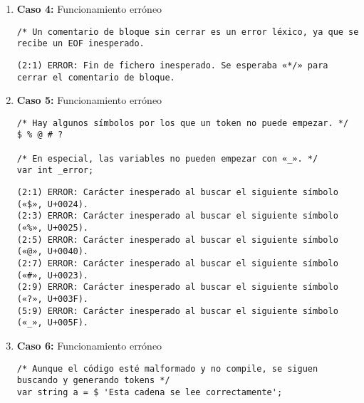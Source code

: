 \documentclass{article}
\begin{document}
\begin{enumerate}
    
    \item \textbf{Caso 4:} Funcionamiento erróneo
    \begin{tcolorbox}[title={Código fuente}, colback=white]
        \begin{lstlisting}
/* Un comentario de bloque sin cerrar es un error léxico, ya que se recibe un EOF inesperado.
        \end{lstlisting}      
    \end{tcolorbox}

    \begin{tcolorbox}[title={Errores detectados}, colback=white]
        \begin{lstlisting}
(2:1) ERROR: Fin de fichero inesperado. Se esperaba «*/» para cerrar el comentario de bloque.
        \end{lstlisting}
    \end{tcolorbox}


    \item \textbf{Caso 5:} Funcionamiento erróneo
    \begin{tcolorbox}[title={Código fuente}, colback=white]
        \begin{lstlisting}
/* Hay algunos símbolos por los que un token no puede empezar. */
$ % @ # ?

/* En especial, las variables no pueden empezar con «_». */
var int _error;
        \end{lstlisting}      
    \end{tcolorbox}

    \begin{tcolorbox}[title={Errores detectados}, colback=white]
        \begin{lstlisting}
(2:1) ERROR: Carácter inesperado al buscar el siguiente símbolo («$», U+0024).
(2:3) ERROR: Carácter inesperado al buscar el siguiente símbolo («%», U+0025).
(2:5) ERROR: Carácter inesperado al buscar el siguiente símbolo («@», U+0040).
(2:7) ERROR: Carácter inesperado al buscar el siguiente símbolo («#», U+0023).
(2:9) ERROR: Carácter inesperado al buscar el siguiente símbolo («?», U+003F).
(5:9) ERROR: Carácter inesperado al buscar el siguiente símbolo («_», U+005F).
        \end{lstlisting}
    \end{tcolorbox}

    
    \item \textbf{Caso 6:} Funcionamiento erróneo
    \begin{tcolorbox}[title={Código fuente}, colback=white]
        \begin{lstlisting}
/* Aunque el código esté malformado y no compile, se siguen buscando y generando tokens */
var string a = $ 'Esta cadena se lee correctamente';


\end{lstlisting}
\end{tcolorbox}
\end{enumerate}
\end{document}
